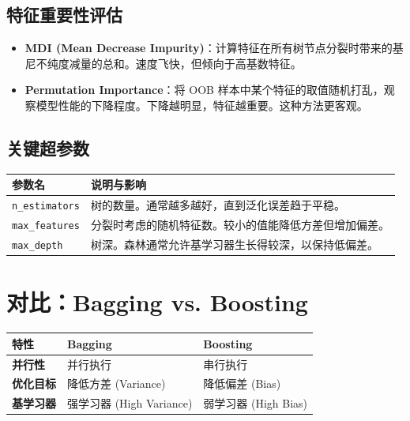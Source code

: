 \documentclass[12pt, a4paper]{article}
\begin{document}
\subsection{特征重要性评估}
\begin{itemize}
    \item \textbf{MDI (Mean Decrease Impurity)}：计算特征在所有树节点分裂时带来的基尼不纯度减量的总和。速度飞快，但倾向于高基数特征。
    \item \textbf{Permutation Importance}：将 OOB 样本中某个特征的取值随机打乱，观察模型性能的下降程度。下降越明显，特征越重要。这种方法更客观。
\end{itemize}

\subsection{关键超参数}
\begin{table}[h]
\centering
\begin{tabularx}{\textwidth}{|l|X|}
\hline
\textbf{参数名} & \textbf{说明与影响} \\
\hline
\texttt{n\_estimators} & 树的数量。通常越多越好，直到泛化误差趋于平稳。 \\
\hline
\texttt{max\_features} & 分裂时考虑的随机特征数。较小的值能降低方差但增加偏差。 \\
\hline
\texttt{max\_depth} & 树深。森林通常允许基学习器生长得较深，以保持低偏差。 \\
\hline
\end{tabularx}
\end{table}

\section{对比：Bagging vs. Boosting}
\begin{table}[h]
\centering
\begin{tabularx}{\textwidth}{|l|X|X|}
\hline
\textbf{特性} & \textbf{Bagging} & \textbf{Boosting} \\
\hline
\textbf{并行性} & 并行执行 & 串行执行 \\
\hline
\textbf{优化目标} & 降低方差 (Variance) & 降低偏差 (Bias) \\
\hline
\textbf{基学习器} & 强学习器 (High Variance) & 弱学习器 (High Bias) \\
\hline
\end{tabularx}
\end{table}
\end{document}
